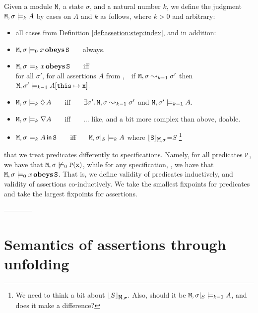 \documentclass[acmsmall,screen]{acmart}
\begin{document}
\begin{definition}
\label{def:assetion:hol:step:index}
 Given a module ${\mbox{\tt{M}}}$, a state $\sigma$, and a natural number $k$, we define the judgment ${\mbox{\tt{M}}}, \sigma \models_k A$ by cases on $A$  and $k$  as follows, where $k>0$ and arbitrary:

\begin{itemize}
\item
all cases from Definition \ref{def:assetion:step:index}, and in addition:
\item
\label{def:assrt:obeys:basic}
${\mbox{\tt{M}}}, \sigma \models_0 x \,\textbf{\textrm{obeys}}\, {\mbox{\tt{S}}}$ \ \ \  always.
\item
\label{def:assrt:obeys}
${\mbox{\tt{M}}}, \sigma \models_k x \,\textbf{\textrm{obeys}}\, {\mbox{\tt{S}}}$ \ \ \  iff \\
  for all  $\sigma'$, for all    assertions $A$ from ,\ \ if  $ {\mbox{\tt{M}}}, \sigma  \leadsto_{k-1} \sigma'$ then  ${\mbox{\tt{M}}}, \sigma' \models_{k-1}  {A[{\mbox{\tt{this}}}\mapsto {\mbox{\tt{x}}}]}$.

\item
\label{def:assrt:Future}
${\mbox{\tt{M}}}, \sigma \models_k \lozenge\, A$ \ \ \  iff \ \ \   $\exists \sigma'.\, {\mbox{\tt{M}}}, \sigma  \leadsto_{k-1} \sigma'$ and ${\mbox{\tt{M}}}, \sigma' \models_{k-1}  {A}$.
\item
\label{def:assrt:past}
${\mbox{\tt{M}}}, \sigma \models_k \nabla A$ \ \ \  iff \ \ \   ... like, and a bit more complex than above, doable.
\item
\label{def:assrt:Using}
${\mbox{\tt{M}}}, \sigma \models_k A\,{\bf{\sf {in}}}\, {\mbox{\tt{S}}}$ \ \ \  iff \ \ \   ${\mbox{\tt{M}}}, \sigma |_{S} \models_k  A$ where ${\lfloor{ {{\mbox{\tt{S}}}}}\rfloor_{{\mbox{\tt{M}}},\sigma}}$=$S$
\footnote{We need to think a bit about ${\lfloor{ {S}}\rfloor_{{\mbox{\tt{M}}},\sigma}}$. Also, should it be ${\mbox{\tt{M}}}, \sigma |_{S} \models_{k-1}  A$, and does it make a difference?}
\end{itemize}

 \end{definition}
\begin{note} that we treat predicates differently to specifications. Namely, for all predicates ${\mbox{\tt{P}}}$, we have that ${\mbox{\tt{M}}}, \sigma \not\models_0 {\mbox{\tt{P}}}({\mbox{\tt{x}}})$, while for any specification, , we have that ${\mbox{\tt{M}}}, \sigma \models_0 x \,\textbf{\textrm{obeys}}\, {\mbox{\tt{S}}}$. That is, we define validity of predicates inductively, and validity of assertions co-inductively. We take the smallest fixpoints for predicates and take the largest fixpoints for assertions.
\end{note}


------------

\section{Semantics of assertions through unfolding}
\end{document}
